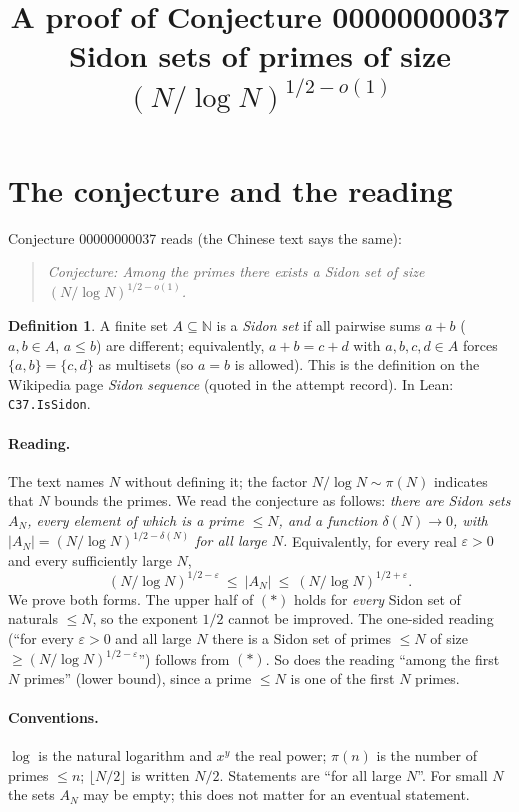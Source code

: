 \documentclass[11pt]{article}
\title{A proof of Conjecture 00000000037\\[2pt]
\large Sidon sets of primes of size $(N/\log N)^{1/2-o(1)}$}
\date{}
\theoremstyle{definition}
\newtheorem{definition}[theorem]{Definition}
\theoremstyle{remark}
\renewcommand{\_}{\oldus\allowbreak}
\begin{document}
\sloppy
\maketitle

\section{The conjecture and the reading}

Conjecture 00000000037 reads (the Chinese text says the same):
\begin{quote}
\emph{Conjecture: Among the primes there exists a Sidon set of size $(N/\log N)^{1/2-o(1)}$.}
\end{quote}

\begin{definition}
A finite set $A\subseteq\mathbb{N}$ is a \emph{Sidon set} if all pairwise sums $a+b$ ($a,b\in A$, $a\le b$)
are different; equivalently, $a+b=c+d$ with $a,b,c,d\in A$ forces $\{a,b\}=\{c,d\}$ as multisets
(so $a=b$ is allowed). This is the definition on the Wikipedia page \emph{Sidon sequence} (quoted in the
attempt record). In Lean: \texttt{C37.IsSidon}.
\end{definition}

\paragraph{Reading.} The text names $N$ without defining it; the factor $N/\log N\sim\pi(N)$ indicates that
$N$ bounds the primes. We read the conjecture as follows: \emph{there are Sidon sets $A_N$, every element
of which is a prime $\le N$, and a function $\delta(N)\to 0$, with $|A_N| = (N/\log N)^{1/2-\delta(N)}$ for
all large $N$.} Equivalently, for every real $\varepsilon>0$ and every sufficiently large $N$,
\[
  (N/\log N)^{1/2-\varepsilon}\ \le\ |A_N|\ \le\ (N/\log N)^{1/2+\varepsilon}. \tag{$\ast$}
\]
We prove both forms. The upper half of $(\ast)$ holds for \emph{every} Sidon set of naturals $\le N$, so the
exponent $1/2$ cannot be improved. The one-sided reading (``for every $\varepsilon>0$ and all large $N$ there
is a Sidon set of primes $\le N$ of size $\ge (N/\log N)^{1/2-\varepsilon}$'') follows from $(\ast)$. So does
the reading ``among the first $N$ primes'' (lower bound), since a prime $\le N$ is one of the first $N$
primes.

\paragraph{Conventions.} $\log$ is the natural logarithm and $x^y$ the real power; $\pi(n)$ is the number of
primes $\le n$; $\lfloor N/2\rfloor$ is written $N/2$. Statements are ``for all large $N$''. For small $N$
the sets $A_N$ may be empty; this does not matter for an eventual statement.
\end{document}
